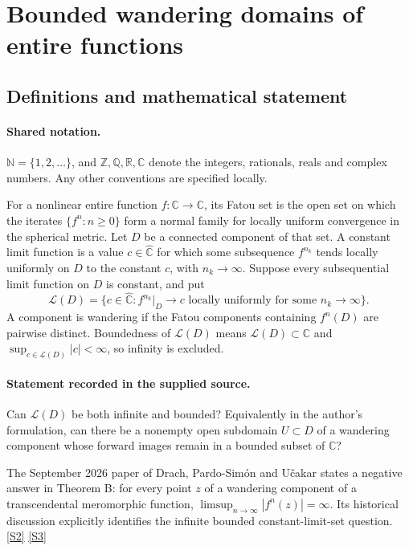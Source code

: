 \documentclass[11pt]{article}
\newcommand{\sref}[2]{\hyperlink{source:#1:#2}{[S#2]}}
\begin{document}
\section{Bounded wandering domains of entire functions}\label{statement}

\subsection{Definitions and mathematical statement}

\paragraph{Shared notation.}$\mathbb N=\{1,2,\ldots\}$, and $\mathbb Z,\mathbb Q,\mathbb R,\mathbb C$ denote the integers, rationals, reals and complex numbers. Any other conventions are specified locally.


For a nonlinear entire function $f:\mathbb C\to\mathbb C$, its Fatou set is the open set on which the iterates $\{f^n:n\ge0\}$ form a normal family for locally uniform convergence in the spherical metric. Let $D$ be a connected component of that set. A constant limit function is a value $c\in\widehat{\mathbb C}$ for which some subsequence $f^{n_k}$ tends locally uniformly on $D$ to the constant $c$, with $n_k\to\infty$. Suppose every subsequential limit function on $D$ is constant, and put
\[
\mathcal L(D)=\{c\in\widehat{\mathbb C}: f^{n_k}|_D\longrightarrow c\text{ locally uniformly for some }n_k\to\infty\}.
\]
A component is wandering if the Fatou components containing $f^n(D)$ are pairwise distinct. Boundedness of $\mathcal L(D)$ means $\mathcal L(D)\subset\mathbb C$ and $\sup_{c\in\mathcal L(D)}|c|<\infty$, so infinity is excluded.
\paragraph{Statement recorded in the supplied source.}
Can $\mathcal L(D)$ be both infinite and bounded? Equivalently in the author's formulation, can there be a nonempty open subdomain $U\subset D$ of a wandering component whose forward images remain in a bounded subset of $\mathbb C$?

The September 2026 paper of Drach, Pardo-Simón and Učakar states a negative answer in Theorem B: for every point $z$ of a wandering component of a transcendental meromorphic function, $\limsup_{n\to\infty}|f^n(z)|=\infty$. Its historical discussion explicitly identifies the infinite bounded constant-limit-set question. \sref{statement}{2} \sref{statement}{3}
\end{document}
